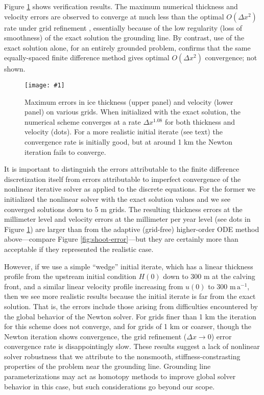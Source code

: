 \documentclass[review,letterpaper]{igs}
\newcommand{\onecol}[1]{\texttt{[image: \#1]}}
\begin{document}
Figure \ref{fig:convmarine} shows verification results.  The maximum numerical thickness and velocity errors are observed to converge at much less than the optimal $O(\Delta x^2)$ rate under grid refinement \citep{MortonMayers}, essentially because of the low regularity (loss of smoothness) of the exact solution the grounding line.  By contrast, use of the \cite{Bodvardsson} exact solution alone, for an entirely grounded problem, confirms that the same equally-spaced finite difference method gives optimal $O(\Delta x^2)$ convergence; not shown.

\begin{figure}[ht]
\onecol{convmarine}
\caption{Maximum errors in ice thickness (upper panel) and velocity (lower panel) on various grids.  When initialized with the exact solution, the numerical scheme converges at a rate $\Delta x^{1.08}$ for both thickness and velocity (dots).  For a more realistic initial iterate (see text) the convergence rate is initially good, but at around 1 km the Newton iteration fails to converge.} \label{fig:convmarine}
\end{figure}

It is important to distinguish the errors attributable to the finite difference discretization itself from errors attributable to imperfect convergence of the nonlinear iterative solver as applied to the discrete equations.  For the former we initialized the nonlinear solver with the exact solution values and we see converged solutions down to 5 m grids.  The resulting thickness errors at the millimeter level and velocity errors at the millimeter per year level (see dots in Figure \ref{fig:convmarine}) are larger than from the adaptive (grid-free) higher-order ODE method above---compare Figure \ref{fig:shoot-error}---but they are certainly more than acceptable if they represented the realistic case.

However, if we use a simple ``wedge'' initial iterate, which has a linear thickness profile from the upstream initial condition $H(0)$ down to 300 m at the calving front, and a similar linear velocity profile increasing from $u(0)$ to 300 $\text{m}\,\text{a}^{-1}$, then we see more realistic results because the initial iterate is far from the exact solution.  That is, the errors include those arising from difficulties encountered by the global behavior of the Newton solver.  For grids finer than 1 km the iteration for this scheme does not converge, and for grids of 1 km or coarser, though the Newton iteration shows convergence, the grid refinement ($\Delta x\to 0$) error convergence rate is disappointingly slow.  These results suggest a lack of nonlinear solver robustness that we attribute to the nonsmooth, stiffness-constrasting properties of the problem near the grounding line.  Grounding line parameterizations \citep[e.g.][]{Gladstoneetal2010,Leguyetal2014TCD} may act as homotopy methods \citep{Kelley} to improve global solver behavior in this case, but such considerations go beyond our scope.
\end{document}
